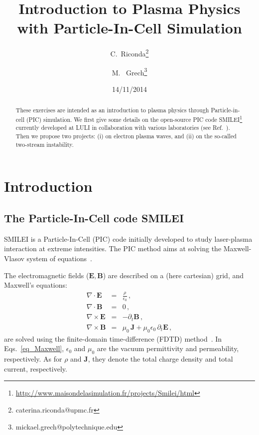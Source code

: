 \documentclass[10pt]{article}
\newcommand{\vE}{\mathbf{E}}
\newcommand{\vB}{\mathbf{B}}
\newcommand{\vJ}{\mathbf{J}}
\begin{document}
\title[TP - UPMC]{Introduction to Plasma Physics with Particle-In-Cell Simulation}


\author{C.~Riconda\footnote{caterina.riconda@upmc.fr}}
\author{M. ~Grech\footnote{mickael.grech@polytechnique.edu}}
\address{Laboratoire pour l'Utilisation des Lasers Intenses}


\date{14/11/2014}

\begin{abstract}
These exercises are intended as an introduction to plasma physics through Particle-in-cell (PIC) simulation.
We first give some details on the open-source PIC code SMILEI\footnote{\url{http://www.maisondelasimulation.fr/projects/Smilei/html}} currently developed at LULI in collaboration with various laboratories (see Ref.~\cite{ref_smilei}).
Then we propose two projects: (i) on electron plasma waves, and (ii) on the so-called two-stream instability.
\end{abstract}
\maketitle              

\vspace{2cm}
\tableofcontents


\section{Introduction}\label{intro}

\subsection{The Particle-In-Cell code SMILEI}

SMILEI is a Particle-In-Cell (PIC) code initially developed to study laser-plasma interaction at extreme intensities. 
The PIC method aims at solving the Maxwell-Vlasov system of  equations~\cite{ref_smilei,birdsall_langdon}.

The electromagnetic fields ($\vE,\vB$) are described on a (here cartesian) grid, and Maxwell's equations:
\begin{subequations}\label{eq_Maxwell}
\begin{eqnarray}
\nabla \cdot \vE &=& \frac{\rho}{\epsilon_0} \,,\\
\nabla \cdot \vB &=& 0 \,,\\
\nabla \times \vE &=& -\partial_t \vB \,,\\
\nabla \times \vB &=& \mu_0\, \vJ + \mu_0 \epsilon_0\,\partial_t \vE \,,
\end{eqnarray}
\end{subequations}
are solved using the finite-domain time-difference (FDTD) method~\cite{taflove_2005}.
In Eqs.~\eqref{eq_Maxwell}, $\epsilon_0$ and $\mu_0$ are the vacuum permittivity and permeability, respectively. 
As for $\rho$ and $\vJ$, they denote the total charge density and total current, respectively.
\end{document}

